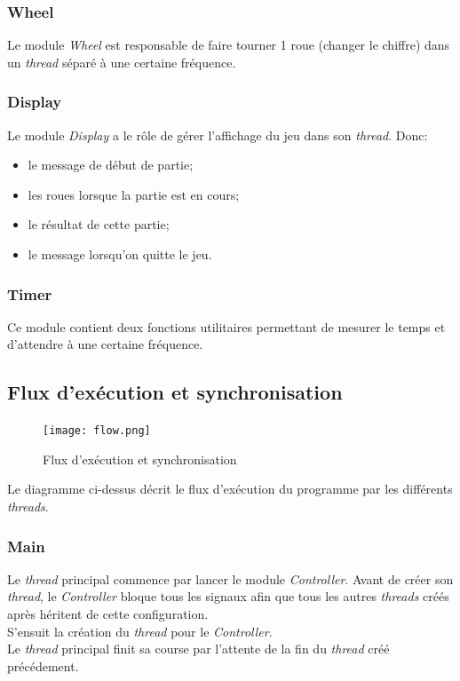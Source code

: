 \documentclass[11pt, a4paper]{article}
\begin{document}
\subsubsection{Wheel}
Le module \textit{Wheel} est responsable de faire tourner 1 roue (changer le chiffre) dans un \textit{thread} séparé à une certaine fréquence.

\subsubsection{Display}
Le module \textit{Display} a le rôle de gérer l'affichage du jeu dans son \textit{thread}. Donc:
\begin{itemize}
    \item le message de début de partie;
    \item les roues lorsque la partie est en cours;
    \item le résultat de cette partie;
    \item le message lorsqu'on quitte le jeu.
\end{itemize}

\subsubsection{Timer}
Ce module contient deux fonctions utilitaires permettant de mesurer le temps et
d'attendre à une certaine fréquence.

\newpage

\subsection{Flux d'exécution et synchronisation}
\label{Flux d'exécution et synchronisation}

\begin{figure}[H]
    \begin{center}
        \texttt{[image: flow.png]}
    \end{center}
    \caption{Flux d'exécution et synchronisation}
    \label{Flux d'exécution et synchronisation}
\end{figure}

\newpage

Le diagramme ci-dessus décrit le flux d'exécution du programme par les différents \textit{threads}.

\subsubsection{Main}
Le \textit{thread} principal commence par lancer le module \textit{Controller}.
Avant de créer son \textit{thread}, le \textit{Controller} bloque tous les signaux
afin que tous les autres \textit{threads} créés après héritent de cette configuration. \\
S'ensuit la création du \textit{thread} pour le \textit{Controller}. \\
Le \textit{thread} principal finit sa course par l'attente de la fin du \textit{thread} créé précédement.
\end{document}
